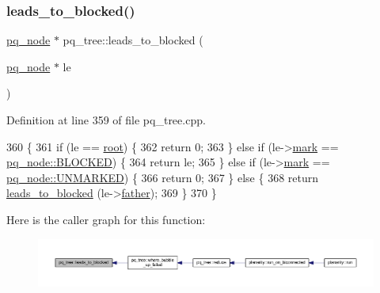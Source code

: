 \subsubsection{\texorpdfstring{leads\+\_\+to\+\_\+blocked()}{leads\_to\_blocked()}}
{\footnotesize\ttfamily \mbox{\hyperlink{classpq__node}{pq\+\_\+node}} $\ast$ pq\+\_\+tree\+::leads\+\_\+to\+\_\+blocked (\begin{DoxyParamCaption}\item[{\mbox{\hyperlink{classpq__node}{pq\+\_\+node}} $\ast$}]{le }\end{DoxyParamCaption})\hspace{0.3cm}{\ttfamily [private]}}



Definition at line 359 of file pq\+\_\+tree.\+cpp.


\begin{DoxyCode}
360 \{
361     \textcolor{keywordflow}{if} (le == \mbox{\hyperlink{classpq__tree_ad8e4e2235fe68fb99769cec54e1760ba}{root}}) \{
362     \textcolor{keywordflow}{return} 0;
363     \} \textcolor{keywordflow}{else} \textcolor{keywordflow}{if} (le->\mbox{\hyperlink{classpq__node_aee913582a7b268ce2570bee8a8367c50}{mark}} == \mbox{\hyperlink{classpq__node_a6236b20cd5f6cc02cb5f637ed34c96d9a70312622ded9f04f068838ec195fc53c}{pq\_node::BLOCKED}}) \{
364     \textcolor{keywordflow}{return} le;
365     \} \textcolor{keywordflow}{else} \textcolor{keywordflow}{if} (le->\mbox{\hyperlink{classpq__node_aee913582a7b268ce2570bee8a8367c50}{mark}} == \mbox{\hyperlink{classpq__node_a6236b20cd5f6cc02cb5f637ed34c96d9a7fbe5f6a363f9f2b5a154c61b2389d59}{pq\_node::UNMARKED}}) \{
366     \textcolor{keywordflow}{return} 0;
367     \} \textcolor{keywordflow}{else} \{
368     \textcolor{keywordflow}{return} \mbox{\hyperlink{classpq__tree_adf4c0caf846fd0c5d793e4797ec46e3e}{leads\_to\_blocked}} (le->\mbox{\hyperlink{classpq__node_a3e7c886498c76c633f057fb42ff9c435}{father}});
369     \}
370 \}
\end{DoxyCode}
Here is the caller graph for this function\+:\nopagebreak
\begin{figure}[H]
\begin{center}
\leavevmode
\includegraphics[width=350pt]{classpq__tree_adf4c0caf846fd0c5d793e4797ec46e3e_icgraph}
\end{center}
\end{figure}
\mbox{\label{classpq__tree_a3f3e775ad71be792aaf061d99d7d2af8}} 
